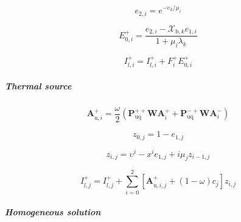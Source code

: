 \begin{equation}
e_{2,i} = e^{-\upsilon_{k} / \mu_{i}}
\label{eq:source_function_integration-local_source_classical-upward-forward-solar_source-e_2_i}
\end{equation}

\begin{equation}
E^{+}_{0,i} = \frac{e_{2,i} - \mathcal{X}_{\mathrm{b},k} e_{1,i}}{1 + \mu_{i} \lambda_{k}} 
\label{eq:source_function_integration-local_source_classical-upward-forward-solar_source-E_p_0_i}
\end{equation}

\begin{equation}
I^{+}_{l,i} = I^{+}_{l,i} + F^{+}_{i} E^{+}_{0,i}
\label{eq:source_function_integration-local_source_classical-upward-forward-solar_source-I_p_l_i_1}
\end{equation}


\subparagraph{Thermal source}
\label{sec:source_function_integration-local_source_classical-upward-forward-thermal_source}

\begin{equation}
\mathbf{A}^{+}_{\mathrm{u},i} = \frac{\omega}{2}(\mathbf{P}^{++}_{\mathrm{uq}}\mathbf{W}\mathbf{A}^{+}_{i} + \mathbf{P}^{-+}_{\mathrm{uq}}\mathbf{W}\mathbf{A}^{-}_{i})
\label{eq:source_function_integration-local_source_classical-upward-forward-thermal_source-A_p_u_i}
\end{equation}

\begin{equation}
z_{0,j} = 1 - e_{1,j}
\label{eq:source_function_integration-local_source_classical-upward-forward-thermal_source-series}
\end{equation}

\begin{equation}
z_{i,j} = \upsilon^{i} - x^{i} e_{1,j} + i \mu_{j} z_{i-1,j}
\label{eq:source_function_integration-local_source_classical-upward-forward-thermal_source-series}
\end{equation}

\begin{equation}
I^{+}_{l,j} = I^{+}_{l,j} + \sum^{2}_{i = 0} \left[\mathbf{A}^{+}_{\mathrm{u},i,j} + (1 - \omega) c_{j}\right] z_{i,j}
\label{eq:source_function_integration-local_source_classical-upward-forward-thermal_source-I_p_l_i_1}
\end{equation}


\subparagraph{Homogeneous solution}
\label{sec:source_function_integration-local_source_classical-upward-forward-homogeneous_solution}

